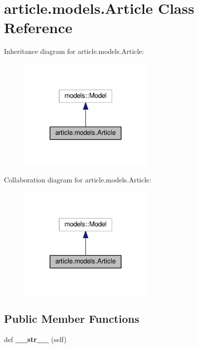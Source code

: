 \hypertarget{classarticle_1_1models_1_1Article}{}\section{article.\+models.\+Article Class Reference}
\label{classarticle_1_1models_1_1Article}


Inheritance diagram for article.\+models.\+Article\+:
\nopagebreak
\begin{figure}[H]
\begin{center}
\leavevmode
\includegraphics[width=188pt]{classarticle_1_1models_1_1Article__inherit__graph}
\end{center}
\end{figure}


Collaboration diagram for article.\+models.\+Article\+:
\nopagebreak
\begin{figure}[H]
\begin{center}
\leavevmode
\includegraphics[width=188pt]{classarticle_1_1models_1_1Article__coll__graph}
\end{center}
\end{figure}
\subsection*{Public Member Functions}
\begin{DoxyCompactItemize}
\item 
\hypertarget{classarticle_1_1models_1_1Article_a5ab20899eca1bb6e672c5bde34115f8d}{}def {\bfseries \+\_\+\+\_\+str\+\_\+\+\_\+} (self)\label{classarticle_1_1models_1_1Article_a5ab20899eca1bb6e672c5bde34115f8d}

\end{DoxyCompactItemize}
